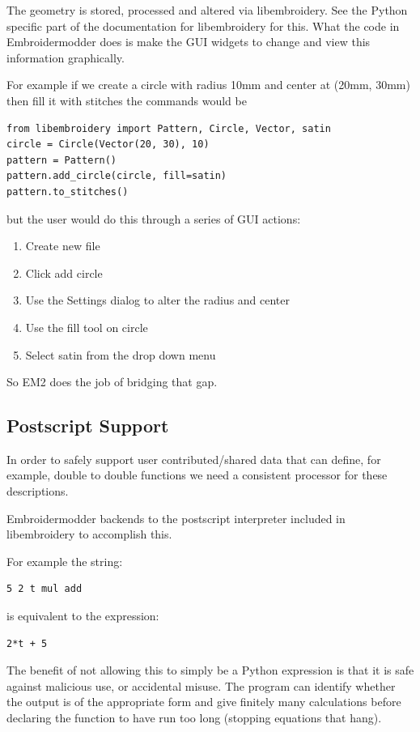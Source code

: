 \documentclass{report}
\begin{document}
The geometry is stored, processed and altered via libembroidery. See the Python specific part of the documentation for libembroidery for this. What the code in Embroidermodder does is make the GUI widgets to change and view this information graphically.

For example if we create a circle with radius 10mm and center at (20mm, 30mm) then fill it with stitches the commands would be

\begin{lstlisting}
from libembroidery import Pattern, Circle, Vector, satin
circle = Circle(Vector(20, 30), 10)
pattern = Pattern()
pattern.add_circle(circle, fill=satin)
pattern.to_stitches()
\end{lstlisting}

but the user would do this through a series of GUI actions:

\begin{enumerate}
\item Create new file
\item Click add circle
\item Use the Settings dialog to alter the radius and center
\item Use the fill tool on circle
\item Select satin from the drop down menu
\end{enumerate}

So EM2 does the job of bridging that gap.

\subsection{Postscript Support}

In order to safely support user contributed/shared data that can define, for example, double to double functions we need a consistent processor for these descriptions.

Embroidermodder backends to the postscript interpreter included
in libembroidery to accomplish this.

For example the string:

\begin{verbatim}
5 2 t mul add
\end{verbatim}

is equivalent to the expression:

\begin{verbatim}
2*t + 5
\end{verbatim}

The benefit of not allowing this to simply be a Python expression is that it is safe against malicious use, or accidental misuse. The program can identify whether the output is of the appropriate form and give finitely many calculations before declaring the function to have run too long (stopping equations that hang).
\end{document}
